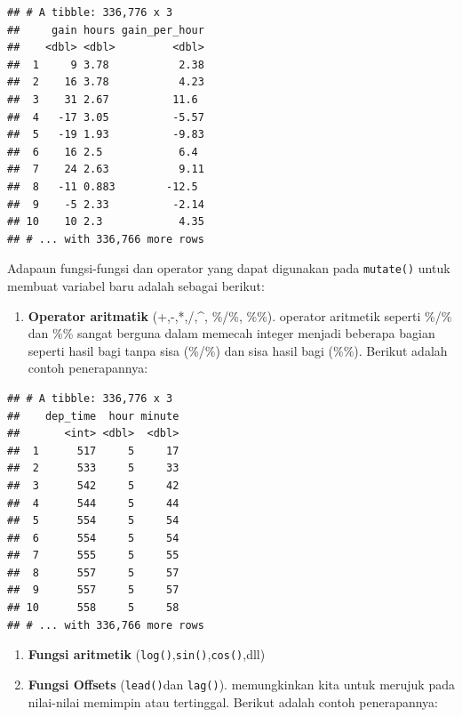 \documentclass[]{book}
\newenvironment{Shaded}{\begin{snugshade}}{\end{snugshade}}
\newcommand{\KeywordTok}[1]{\textcolor[rgb]{0.13,0.29,0.53}{\textbf{#1}}}
\newcommand{\DataTypeTok}[1]{\textcolor[rgb]{0.13,0.29,0.53}{#1}}
\newcommand{\DecValTok}[1]{\textcolor[rgb]{0.00,0.00,0.81}{#1}}
\newcommand{\StringTok}[1]{\textcolor[rgb]{0.31,0.60,0.02}{#1}}
\newcommand{\OperatorTok}[1]{\textcolor[rgb]{0.81,0.36,0.00}{\textbf{#1}}}
\newcommand{\NormalTok}[1]{#1}
\providecommand{\tightlist}{%
  \setlength{\itemsep}{0pt}\setlength{\parskip}{0pt}}
\begin{document}
\begin{verbatim}
## # A tibble: 336,776 x 3
##     gain hours gain_per_hour
##    <dbl> <dbl>         <dbl>
##  1     9 3.78           2.38
##  2    16 3.78           4.23
##  3    31 2.67          11.6 
##  4   -17 3.05          -5.57
##  5   -19 1.93          -9.83
##  6    16 2.5            6.4 
##  7    24 2.63           9.11
##  8   -11 0.883        -12.5 
##  9    -5 2.33          -2.14
## 10    10 2.3            4.35
## # ... with 336,766 more rows
\end{verbatim}

Adapaun fungsi-fungsi dan operator yang dapat digunakan pada
\texttt{mutate()} untuk membuat variabel baru adalah sebagai berikut:

\begin{enumerate}
\def\labelenumi{\arabic{enumi}.}
\tightlist
\item
  \textbf{Operator aritmatik} (+,-,*,/,\^{}, \%/\%, \%\%). operator
  aritmetik seperti \%/\% dan \%\% sangat berguna dalam memecah integer
  menjadi beberapa bagian seperti hasil bagi tanpa sisa (\%/\%) dan sisa
  hasil bagi (\%\%). Berikut adalah contoh penerapannya:
\end{enumerate}

\begin{Shaded}
\end{Shaded}

\begin{verbatim}
## # A tibble: 336,776 x 3
##    dep_time  hour minute
##       <int> <dbl>  <dbl>
##  1      517     5     17
##  2      533     5     33
##  3      542     5     42
##  4      544     5     44
##  5      554     5     54
##  6      554     5     54
##  7      555     5     55
##  8      557     5     57
##  9      557     5     57
## 10      558     5     58
## # ... with 336,766 more rows
\end{verbatim}

\begin{enumerate}
\def\labelenumi{\arabic{enumi}.}
\setcounter{enumi}{1}
\tightlist
\item
  \textbf{Fungsi aritmetik}
  (\texttt{log()},\texttt{sin()},\texttt{cos()},dll)
\item
  \textbf{Fungsi Offsets} (\texttt{lead()}dan \texttt{lag()}).
  memungkinkan kita untuk merujuk pada nilai-nilai memimpin atau
  tertinggal. Berikut adalah contoh penerapannya:
\end{enumerate}
\end{document}
